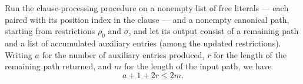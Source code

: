 \begin{lemma}
\label{SwitchingLemma.processClauseLits_tight}
\leanok
{}
Run the clause-processing procedure on a nonempty list of free literals — each paired
with its position index in the clause — and a nonempty canonical path, starting from
restrictions $\rho_0$ and $\sigma$, and let its output consist of a remaining path and a
list of accumulated auxiliary entries (among the updated restrictions). Writing $a$ for
the number of auxiliary entries produced, $r$ for the length of the remaining path
returned, and $m$ for the length of the input path, we have
\[
a + 1 + 2r \le 2m.
\]
\end{lemma}

